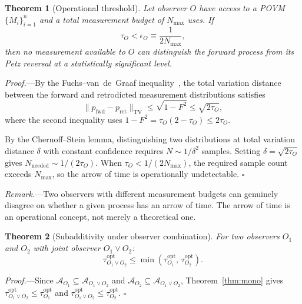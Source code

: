 \documentclass[prl,twocolumn,superscriptaddress,longbibliography,floatfix]{revtex4-2}
\newtheorem{theorem}{Theorem}
\newcommand{\tauasym}{\tau}
\newcommand{\algO}{\mathcal{A}}
\begin{document}
\begin{theorem}[Operational threshold]
\label{thm:thresh}
Let observer $O$ have access to a POVM $\{M_i\}_{i=1}^{n}$ and
a total measurement budget of $N_{\max}$ uses.  If
\begin{equation}
\tauasym_O < \epsilon_O \equiv \frac{1}{2N_{\max}},
\label{eq:threshold}
\end{equation}
then no measurement available to $O$ can distinguish the forward
process from its Petz reversal at a statistically significant level.
\end{theorem}

\emph{Proof.}---By the Fuchs--van~de~Graaf
inequality~\cite{FuchsGraaf1999}, the total variation distance
between the forward and retrodicted measurement distributions
satisfies
\begin{equation}
\|p_{\mathrm{fwd}} - p_{\mathrm{ret}}\|_{\mathrm{TV}}
\leq \sqrt{1 - F^2} \leq \sqrt{2\tauasym_O},
\label{eq:tv}
\end{equation}
where the second inequality uses
$1 - F^2 = \tauasym_O(2 - \tauasym_O) \leq 2\tauasym_O$.

By the Chernoff--Stein lemma, distinguishing two distributions
at total variation distance $\delta$ with constant confidence
requires $N \sim 1/\delta^2$ samples.  Setting
$\delta = \sqrt{2\tauasym_O}$ gives
$N_{\mathrm{needed}} \sim 1/(2\tauasym_O)$.  When
$\tauasym_O < 1/(2N_{\max})$, the required sample count exceeds
$N_{\max}$, so the arrow of time is operationally
undetectable.  \hfill$\square$

\emph{Remark.}---Two observers with different measurement
budgets can genuinely disagree on whether a given process has an
arrow of time.  The arrow of time is an operational concept,
not merely a theoretical one.

\begin{theorem}[Subadditivity under observer combination]
\label{thm:sub}
For two observers $O_1$ and $O_2$ with joint observer
$O_1 \vee O_2$:
\begin{equation}
\tauasym_{O_1 \vee O_2}^{\mathrm{opt}}
\leq \min(\tauasym_{O_1}^{\mathrm{opt}},\,
  \tauasym_{O_2}^{\mathrm{opt}}).
\label{eq:sub}
\end{equation}
\end{theorem}

\emph{Proof.}---Since $\algO_{O_1} \subseteq
\algO_{O_1 \vee O_2}$ and $\algO_{O_2} \subseteq
\algO_{O_1 \vee O_2}$, Theorem~\ref{thm:mono} gives
$\tauasym_{O_1 \vee O_2}^{\mathrm{opt}}
\leq \tauasym_{O_1}^{\mathrm{opt}}$ and
$\tauasym_{O_1 \vee O_2}^{\mathrm{opt}}
\leq \tauasym_{O_2}^{\mathrm{opt}}$. \hfill$\square$
\end{document}
